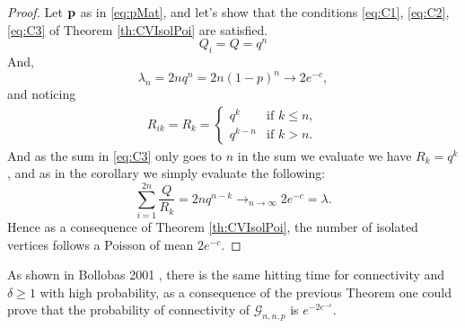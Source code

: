 \begin{proof}
	Let $\bold{p}$ as in \ref{eq:pMat}, and let's show that the conditions \eqref{eq:C1}, \eqref{eq:C2}, \eqref{eq:C3} of Theorem \ref{th:CVIsolPoi} are satisfied. 
	\begin{equation}
		Q_i = Q = q^{n}
	\end{equation}
	And,
	\begin{equation}
		\lambda_n = 2n q^{n}= 2n(1-p)^n \longrightarrow 2 e^{-c},
	\end{equation}
	and noticing 
	\begin{align}
		R_{ik} = R_k = \left\{	\begin{array}{rl}
						q^k & \text{if } k\leq n,\\
						q^{k-n} & \text{if } k > n.
					 \end{array}
				\right.
	\end{align}
	And as the sum in \eqref{eq:C3} only goes to $n$ in the sum we evaluate we have $R_k = q^k$, and as in the corollary we simply evaluate the following:
	\begin{equation}
		\sum_{i=1}^{2n} \frac{Q}{R_k} =2n q^{n-k} \longrightarrow_{n\to\infty} 2e^{-c} = \lambda.
	\end{equation}
	Hence as a consequence of Theorem \ref{th:CVIsolPoi}, the number of isolated vertices follows a Poisson of mean $2e^{-c}$.
\end{proof}
As shown in Bollobas 2001 \cite{Bollob01}, there is the same hitting time for connectivity and $\delta \geq 1$ with high probability, as a consequence of the previous Theorem one could prove that the probability of connectivity of $\mathcal{G}_{n,n, p}$ is $e^{-2e^{-c}}$. 


